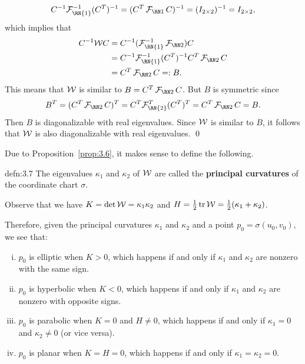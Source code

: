 \begin{pf}
    \[ C^{-1} {\cal F}_{\text{\RN{1}}}^{-1} (C^T)^{-1} = (C^T \FFF C)^{-1} = (I_{2\times 2})^{-1} = 
    I_{2\times 2}, \] 
    which implies that 
    \begin{align*}
        C^{-1}{\cal W}C &= C^{-1}({\cal F}_{\text{\RN{1}}}^{-1} \SFF)C \\
        &= C^{-1}{\cal F}_{\text{\RN{1}}}^{-1} (C^T)^{-1} C^T \SFF C \\ 
        &= C^T \SFF C =: B. 
    \end{align*}
    This means that ${\cal W}$ is similar to $B = C^T \SFF C$. But $B$ 
    is symmetric since 
    \[ B^T = (C^T \SFF C)^T = C^T {\cal F}_{\text{\RN{2}}}^T (C^T)^T = C^T \SFF C = B. \] 
    Then $B$ is diagonalizable with real eigenvalues. Since ${\cal W}$ is 
    similar to $B$, it follows that ${\cal W}$ is also diagonalizable with 
    real eigenvalues. \qed 
\end{pf}\vspace{-0.25cm}

Due to Proposition~\ref{prop:3.6}, it makes sense to define the following. 

\begin{defn}{defn:3.7}
    The eigenvalues $\kappa_1$ and $\kappa_2$ of ${\cal W}$ 
    are called the {\bf principal curvatures} of the coordinate chart $\sigma$. 
\end{defn}\vspace{-0.25cm} 

Observe that we have $K = \det{\cal W} = \kappa_1\kappa_2$ and 
$H = \frac12\operatorname{tr}{\cal W} = \frac12(\kappa_1 + \kappa_2)$. 

Therefore, given the principal curvatures $\kappa_1$ and $\kappa_2$ 
and a point $p_0 = \sigma(u_0, v_0)$, we see that: 
\begin{enumerate}[(i)]
    \item $p_0$ is elliptic when $K > 0$, which happens 
    if and only if $\kappa_1$ and $\kappa_2$ are nonzero with the same sign. 
    \item $p_0$ is hyperbolic when $K < 0$, which happens if and only if 
    $\kappa_1$ and $\kappa_2$ are nonzero with opposite signs. 
    \item $p_0$ is parabolic when $K = 0$ and $H \neq 0$, which 
    happens if and only if $\kappa_1 = 0$ and $\kappa_2 \neq 0$ (or vice versa). 
    \item $p_0$ is planar when $K = H = 0$, which happens if and only if 
    $\kappa_1 = \kappa_2 = 0$. 
\end{enumerate}

